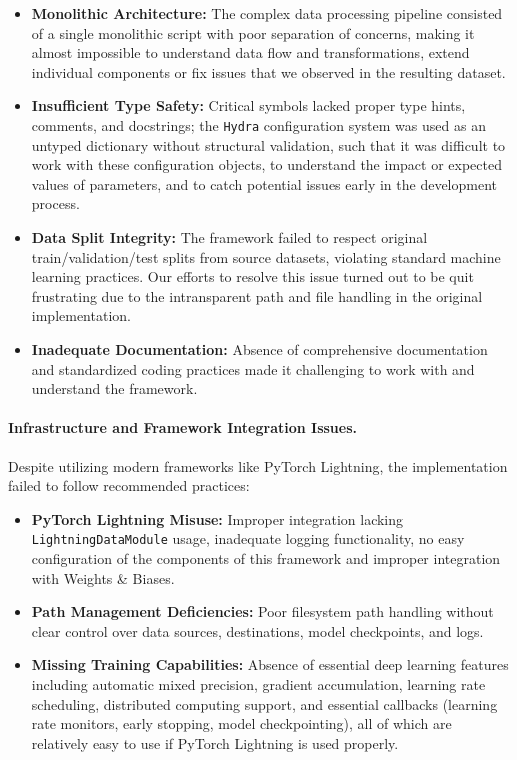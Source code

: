 \begin{itemize}[leftmargin=*]
    \item \textbf{Monolithic Architecture:} The complex data processing pipeline consisted of a single monolithic script with poor separation of concerns, making it almost impossible to understand data flow and transformations, extend individual components or fix issues that we observed in the resulting dataset.
    \item \textbf{Insufficient Type Safety:} Critical symbols lacked proper type hints, comments, and docstrings; the \texttt{Hydra} configuration system was used as an untyped dictionary without structural validation, such that it was difficult to work with these configuration objects, to understand the impact or expected values of parameters, and to catch potential issues early in the development process.
    \item \textbf{Data Split Integrity:} The framework failed to respect original train/validation/test splits from source datasets, violating standard machine learning practices. Our efforts to resolve this issue turned out to be quit frustrating due to the intransparent path and file handling in the original implementation.
    \item \textbf{Inadequate Documentation:} Absence of comprehensive documentation and standardized coding practices made it challenging to work with and understand the framework.
\end{itemize}

\paragraph{Infrastructure and Framework Integration Issues.}
Despite utilizing modern frameworks like PyTorch Lightning, the implementation failed to follow recommended practices:

\begin{itemize}[leftmargin=*]
    \item \textbf{PyTorch Lightning Misuse:} Improper integration lacking \linebreak\texttt{LightningDataModule} usage, inadequate logging functionality, no easy configuration of the components of this framework and improper integration with Weights \& Biases.
    \item \textbf{Path Management Deficiencies:} Poor filesystem path handling without clear control over data sources, destinations, model checkpoints, and logs.
    \item \textbf{Missing Training Capabilities:} Absence of essential deep learning features including automatic mixed precision, gradient accumulation, learning rate scheduling, distributed computing support, and essential callbacks (learning rate monitors, early stopping, model checkpointing), all of which are relatively easy to use if PyTorch Lightning is used properly.
\end{itemize}


